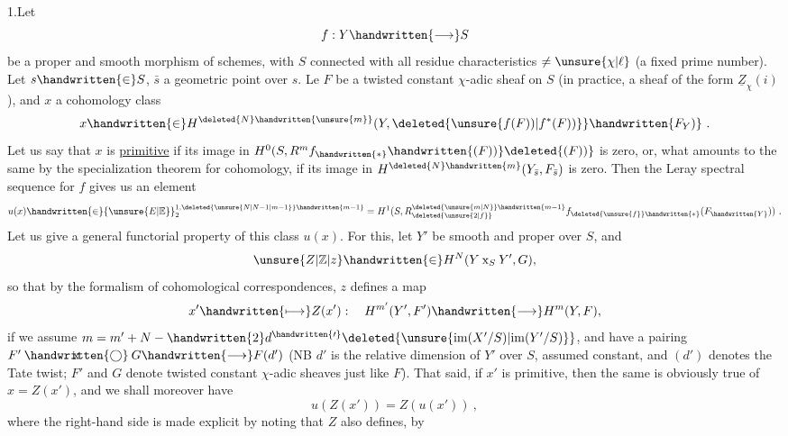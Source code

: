 
1.\quad Let
\[
f:Y\handwritten{\longrightarrow}S
\]
be a proper and smooth morphism of schemes, with $S$  connected with all residue characteristics $\ne\unsure{\chi|\ell}$ (a fixed prime number). Let $s\handwritten{\in}S$, $\bar s$ a geometric point over $s$. Le $F$ be a twisted constant $\chi$-adic sheaf on $S$ (in practice, a sheaf of the form $\underline{Z}_{\chi}(i)$ ), and $x$ a cohomology class
\[
x\handwritten{\in}H^{\deleted{N}\handwritten{\unsure{m}}}(Y,\deleted{\unsure{f(F))|f^*(F))}}\handwritten{F_Y)}\ .
\]
Let us say that $x$ is \uline{primitive} if its image in $H^0(S,R^m f_{\handwritten{*}}\handwritten{(F))}\deleted{(F))}$ is zero, or, what amounts to the same by the specialization theorem for cohomology, if its image in $H^{\deleted{N}\handwritten{m}}(Y_{\bar s},F_{\bar s})$ is zero. Then the Leray spectral sequence for $f$ gives us an element
\[
u(x)\handwritten{\in}{\unsure{E|\mathbb{E}}}_2^{1,\deleted{\unsure{N|N-1|m-1}}\handwritten{m-1}}=H^1(S,R^{\deleted{\unsure{m|N}}\handwritten{m-1}}_{\deleted{\unsure{2|f}}}f_{\deleted{\unsure{f}}\handwritten{*}}(F_{\handwritten{Y}}))\ .
\]
Let us give a general functorial property of this class $u(x)$. For this, let $Y'$ be smooth and proper over $S$, and
\[
\unsure{Z|\mathbb{Z}|z}\handwritten{\in}H^N(Y\mathbin{\mathrm{x}}_S Y',G),
\]
so that by the formalism of cohomological correspondences, $z$ defines a map
\[
x'\handwritten{\longmapsto}Z(x'): \quad H^{m'}(Y',F')\handwritten{\longrightarrow}H^m(Y,F),
\]
if we assume $m=m'+N-\handwritten{2}d^{\handwritten{\prime}}\deleted{\unsure{\mathrm{im}(X'/S)|\mathrm{im}(Y'/S)}}$, and have a pairing $F'\mathbin{\ooalign{\hfil$\mathrm{x}$\hfil\cr\hfil$\handwritten{\bigcirc}$\hfil\cr}}G\handwritten{\longrightarrow}F(d')$ (NB $d'$ is the relative dimension of $Y'$ over $S$, assumed constant, and $(d')$ denotes the Tate twist; $F'$ and $G$ denote twisted constant $\chi$-adic sheaves  just like $F$). That said, if $x'$ is primitive, then the same is obviously true of $x=Z(x')$, and we shall moreover have
\[
u(Z(x'))=Z(u(x'))\ ,
\]
where the right-hand side is made explicit by noting that $Z$ also defines, by
